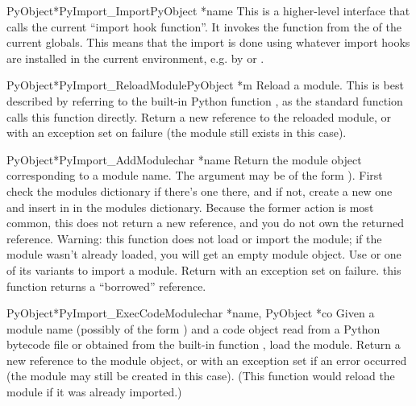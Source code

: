 \documentclass{manual}
\begin{document}
\begin{cfuncdesc}{PyObject*}{PyImport_Import}{PyObject *name}
This is a higher-level interface that calls the current ``import hook
function''.  It invokes the  function from the
 of the current globals.  This means that the
import is done using whatever import hooks are installed in the
current environment, e.g. by  or
.
\end{cfuncdesc}

\begin{cfuncdesc}{PyObject*}{PyImport_ReloadModule}{PyObject *m}
Reload a module.  This is best described by referring to the built-in
Python function , as the standard
 function calls this function directly.  Return a
new reference to the reloaded module, or \NULL{} with an exception set
on failure (the module still exists in this case).
\end{cfuncdesc}

\begin{cfuncdesc}{PyObject*}{PyImport_AddModule}{char *name}
Return the module object corresponding to a module name.  The
 argument may be of the form ).  First
check the modules dictionary if there's one there, and if not, create
a new one and insert in in the modules dictionary.  Because the former
action is most common, this does not return a new reference, and you
do not own the returned reference.
Warning: this function does not load or import the module; if the
module wasn't already loaded, you will get an empty module object.
Use  or one of its variants to
import a module.
Return \NULL{} with an
exception set on failure.   this function returns
a ``borrowed'' reference.  
\end{cfuncdesc}

\begin{cfuncdesc}{PyObject*}{PyImport_ExecCodeModule}{char *name, PyObject *co}
Given a module name (possibly of the form ) and a
code object read from a Python bytecode file or obtained from the
built-in function , load the
module.  Return a new reference to the module object, or \NULL{} with
an exception set if an error occurred (the module may still be created
in this case).  (This function would reload the module if it was
already imported.)
\end{cfuncdesc}
\end{document}
